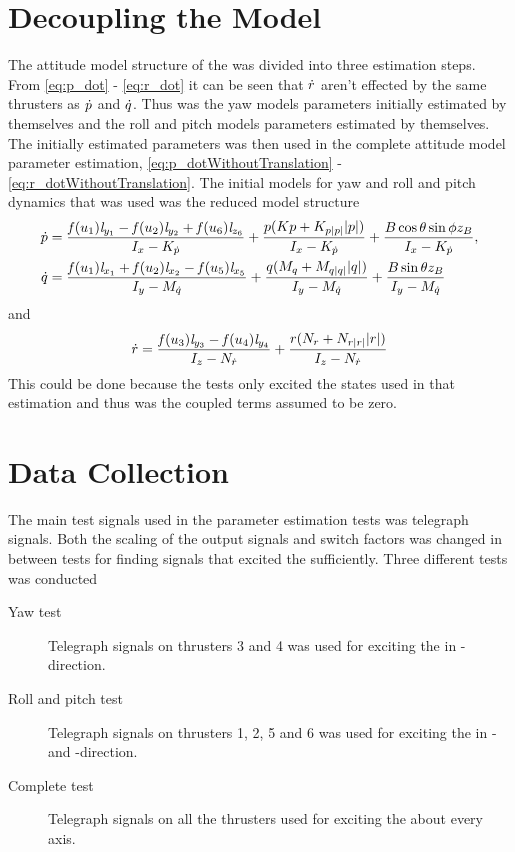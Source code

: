 \section{Decoupling the Model}
The attitude model structure of the \abbrROV was divided into three estimation steps. From \eqref{eq:p_dot} - \eqref{eq:r_dot} it can be seen that $\dot{r}$ aren't effected by the same thrusters as $\dot{p}$ and $\dot{q}$. Thus was the yaw models parameters initially estimated by themselves and the roll and pitch models parameters estimated by themselves. The initially estimated parameters was then used in the complete attitude model parameter estimation, \eqref{eq:p_dotWithoutTranslation} - \eqref{eq:r_dotWithoutTranslation}. The initial models for yaw and roll and pitch dynamics that was used was the reduced model structure
\begin{align} \label{eq:pq_dot_simple}
\dot{p} &= \frac{\mathit{f}(u_{1}) \mathit{l}_{y_{1}} - \mathit{f}(u_{2}) \mathit{l}_{y_{2}} + \mathit{f}(u_{6}) \mathit{l}_{z_{6}}}{I_{x} - K_{\dot{p}}} + \frac{p (Kp + K_{p|p|} |p|)}{I_{x} - K_{\dot{p}}} + \frac{B \cos{\theta} \sin{\phi} z_B}{I_{x} - K_{\dot{p}}}, \\ \label{eq:pq_dot_simple2}
\dot{q} &=\frac{\mathit{f}(u_{1}) \mathit{l}_{x_{1}} + \mathit{f}(u_{2}) \mathit{l}_{x_{2}} - \mathit{f}(u_{5}) \mathit{l}_{x_{5}}}{I_{y} - M_{\dot{q}}} + \frac{q (M_{q} + M_{q|q|} |q|)}{I_{y} - M_{\dot{q}}} + \frac{B \sin{\theta} z_B}{I_{y} - M_{\dot{q}}} 
\end{align} and
\begin{equation} \label{eq:r_dot_simple}
\dot{r} = \frac{\mathit{f}(u_{3}) \mathit{l}_{y_{3}} - \mathit{f}(u_{4}) \mathit{l}_{y_{4}}}{I_{z} - N_{\dot{r}}} + \frac{r (N_{r} + N_{r|r|} |r|)}{I_{z} - N_{\dot{r}}}
\end{equation}
This could be done because the tests only excited the states used in that estimation and thus was the coupled terms assumed to be zero.

\section{Data Collection}
The main test signals used in the parameter estimation tests was telegraph signals. Both the scaling of the output signals and switch factors was changed in between tests for finding signals that excited the \abbrROV sufficiently.
Three different tests was conducted 
\begin{description}
\item[Yaw test] Telegraph signals on thrusters 3 and 4 was used for exciting the \abbrROV in \yawAngle-direction.
\item[Roll and pitch test] Telegraph signals on thrusters 1, 2, 5 and 6 was used for exciting the \abbrROV in \rollAngle- and \pitchAngle-direction.
\item[Complete test] Telegraph signals on all the thrusters used for exciting the \abbrROV about every axis.
\end{description}

